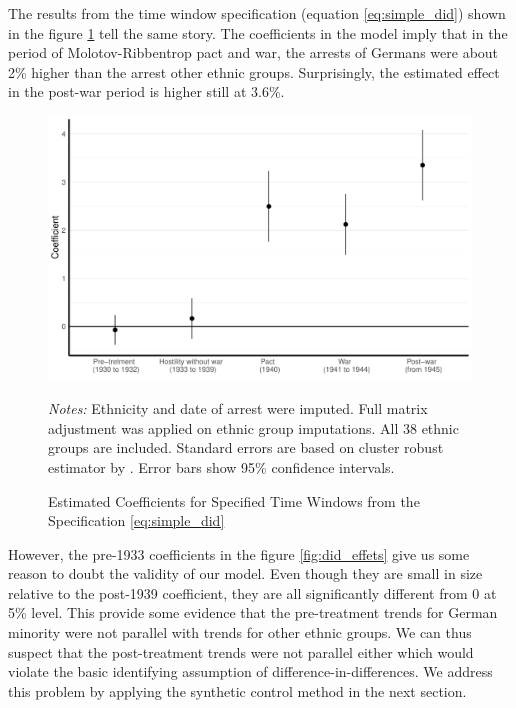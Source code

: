  
 The results from the time window specification (equation \ref{eq:simple_did}) shown in the figure \ref{fig:did_effets_time_window} tell the same story.  The coefficients in the model imply that in the period of Molotov-Ribbentrop pact and war, the arrests of Germans were about 2\% higher than the arrest other ethnic groups. Surprisingly, the estimated effect in the post-war period is higher still at  3.6\%.
 
 \begin{figure}[h]
\centering
\caption{Estimated Coefficients for Specified Time Windows from the Specification \ref{eq:simple_did}}
\includegraphics[width=\textwidth]{plots/effects/ethnicity_imputation/annual/time_window_pre_treatment_date_imp.pdf}
\begin{minipage}{0.92\textwidth}
\footnotesize
\emph{Notes:} Ethnicity and date of arrest were imputed.  Full matrix adjustment was applied on ethnic group imputations. All 38 ethnic groups are included. Standard errors are based on cluster robust estimator by \citet{pustejovsky_small-sample_2018}. Error bars show 95\% confidence intervals. 
\end{minipage}
\label{fig:did_effets_time_window}
\end{figure}
 
However, the pre-1933 coefficients in the figure \ref{fig:did_effets} give us some reason to doubt the
validity of our model. Even though they are small in size relative to the post-1939 coefficient, they are all  significantly different from 0 at 5\% level.
This provide some evidence that the pre-treatment trends for German minority were not parallel with trends for other ethnic groups. We can thus suspect that the post-treatment trends were not parallel either which
would violate the basic identifying assumption of
difference-in-differences.
We address this problem by applying the synthetic control method in the next section. 
 
